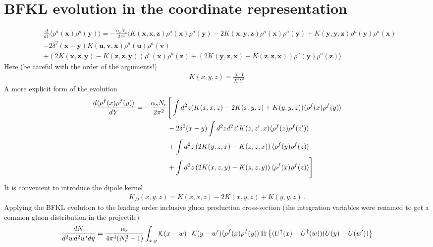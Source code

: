 \documentclass[aps,prd,amsmath,amssymb,nofootinbib]{revtex4-2}
\def\v#1{\mathbf{#1}}
\numberwithin{equation}{section}
\begin{document}
\section{BFKL evolution in the coordinate representation}


\begin{align}\label{v-bfkl}
   & \frac{d}{dY}
   \langle \rho^a(\v x)\rho^a(\v y)\rangle=
    - 
    {\frac{\alpha_s N_c}{2 \pi^2} } 
    \biggl\langle
    K(\v x,\v x,\v z)\rho^a(\v x)\rho^a(\v y)
    -2K(\v x,\v y,\v z)\rho^a(\v x)\rho^a(\v y)+K(\v y,\v y,\v z)\rho^a(\v y)\rho^a(\v x) \\
    & -2\delta^2(\v x-\v y)K(\v u,\v v,\v x)\rho^a(\v u)\rho^a(\v v)\nonumber
    \nonumber \\
    & +\left( 2 K(\v x, \v z, \v y)  - K(\v z,\v z,\v y) \right)   \rho^a(\v x)\rho^a(\v z) +\left( 2 K(\v y, \v z, \v x)  - K(\v z,\v z,\v x) \right)   \rho^a(\v y)\rho^a(\v z)\biggl\rangle 
\nonumber
\end{align}
Here (be careful with the order of the arguments!)
\begin{align}
    K(x,y,z) = \frac{X\cdot Y}{X^2 Y^2}
\end{align}
A more explicit form of the evolution 
\begin{align}
    \frac{d \langle \rho^f(x) \rho^f(y)\rangle }{dY}
    = - \frac{\alpha_s N_c}{2\pi^2} 
    &\Bigg[
    \int d^2z (  K(x,x,z) - 2 K(x,y,z)  + K(y,y,z)) \langle \rho^f(x) \rho^f(y)\rangle
    \notag \\ & 
    - 2 \delta^2(x-y) \int d^2z d^2z' K(z,z',x) \langle \rho^f(z) \rho^f(z')\rangle  
    \notag \\ & 
     + \int d^2z \left(  2 K(y,z,x) - K(z,z,x)  \right) \langle \rho^f(y) \rho^f(z)\rangle 
    \notag \\ & 
     + \int d^2z \left(  2 K(x,z,y) - K(z,z,y)  \right) \langle \rho^f(x) \rho^f(z)\rangle 
    \Bigg]
\end{align}
It is convenient to introduce the dipole kernel 
\begin{align}
    K_D(x,y,z) =  K(x,x,z) - 2 K(x,y,z)  + K(y,y,z)\,.
\end{align}
Applying the BFKL evolution to the leading order inclusive gluon production cross-section (the integration variables were renamed to get a common gluon distribution in the projectile)
\begin{align}
\label{Eq:LOx}
    \frac{dN}{d^2 w d^2 w' dy}= \frac{\alpha_s}{4 \pi^4(N_c^2-1)}
    \int_{x,y} {\cal K} (x-w) \cdot {\cal K} (y-w')  \langle \rho^f(x) \rho^f(y)\rangle {\rm Tr} \left\{  (U^\dagger(x)-U^\dagger(w)) (U(y)-U(w')) \right\}
\end{align}
\end{document}
